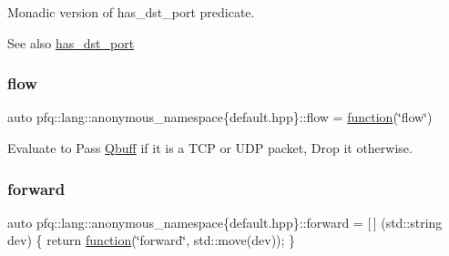 Monadic version of {\ttfamily has\+\_\+dst\+\_\+port} predicate. 

\begin{DoxySeeAlso}{See also}
\hyperlink{namespacepfq_1_1lang_1_1anonymous__namespace_02default_8hpp_03_afa71ece0f4178d0200c0388f503eef14}{has\+\_\+dst\+\_\+port} 
\end{DoxySeeAlso}
\mbox{\label{namespacepfq_1_1lang_1_1anonymous__namespace_02default_8hpp_03_af6c7518847c8c960b0e98cd856871a1b}} 
\subsubsection{\texorpdfstring{flow}{flow}}
{\footnotesize\ttfamily auto pfq\+::lang\+::anonymous\+\_\+namespace\{default.\+hpp\}\+::flow = \hyperlink{namespacepfq_1_1lang_a1a4638059d700ae08d0ca63886ff2bb3}{function}(\char`\"{}flow\char`\"{})}



Evaluate to {\ttfamily Pass} \hyperlink{structpfq_1_1lang_1_1Qbuff}{Qbuff} if it is a T\+CP or U\+DP packet, {\ttfamily Drop} it otherwise. 

\mbox{\label{namespacepfq_1_1lang_1_1anonymous__namespace_02default_8hpp_03_aae08247030fea0f5e398b0a03d382257}} 
\subsubsection{\texorpdfstring{forward}{forward}}
{\footnotesize\ttfamily auto pfq\+::lang\+::anonymous\+\_\+namespace\{default.\+hpp\}\+::forward = \mbox{[}$\,$\mbox{]} (std\+::string dev) \{ return \hyperlink{namespacepfq_1_1lang_a1a4638059d700ae08d0ca63886ff2bb3}{function}(\char`\"{}forward\char`\"{}, std\+::move(dev)); \}}



